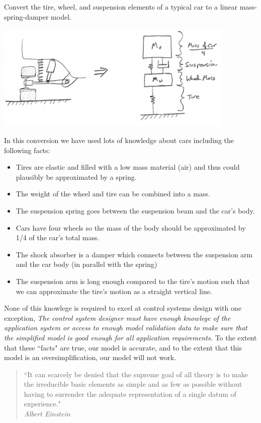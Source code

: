 \begin{Example}\label{ExampleCarSuspension}

Convert the tire, wheel, and suspension elements of a typical car to a linear mass-spring-damper model.


\includegraphics[width=4.5in]{figs02/00719a.png}


In this conversion we have used lots of knowledge about cars including the following facts:


 \begin{itemize}
   \item Tires are elastic and filled with a low mass material (air) and thus could plausibly be approximated by a spring.
   \item The weight of the wheel and tire can be combined into a mass.
   \item The suspension spring goes between the suspension beam and the car's body.
   \item Cars have four wheels so the mass of the body should be approximated by 1/4 of the car's total mass.
   \item The shock absorber is a damper which connects between the suspension arm and the car body (in parallel with the spring)
   \item The suspension arm is long enough compared to the tire's motion such that we can approximate the tire's motion as a straight vertical line.
 \end{itemize}


None of this knowlege is required to excel at control systems design with one exception, {\it The control system designer must have enough knowlege of the application system or access to enough model validation data to make sure that the simplified model is good enough for all application requirements. } To the extent that these ``facts" are true, our model is accurate, and to the extent that this model is an oversimplification, our model will not work.


\begin{quotation}``It can scarcely be denied that the supreme goal of all theory is to make the irreducible basic elements as simple and as few as possible without having to surrender the adequate representation of a single datum of experience." \\
{\it Albert Einstein}
\end{quotation}




\end{Example}





